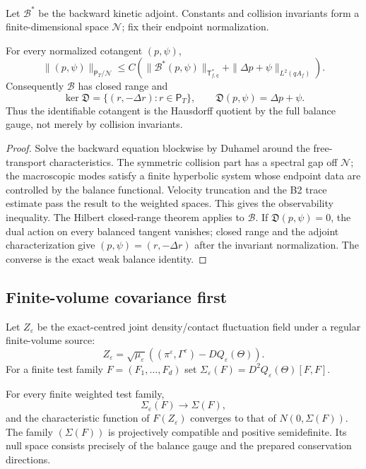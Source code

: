 Let $\mathcal B^*$ be the backward kinetic adjoint.  Constants and collision
invariants form a finite-dimensional space $\mathcal N$; fix their endpoint
normalization.

\begin{theorem}
\label{thm:r9-b3-range}
For every normalized cotangent $(p,\psi)$,
\[
 \|(p,\psi)\|_{\mathsf P_T/\mathcal N}
 \le C\left(
  \|\mathcal B^*(p,\psi)\|_{\mathsf T_{f,q}^*}
  +\|\Delta p+\psi\|_{L^2(qA_f)}
 \right).
\]
Consequently $\mathcal B$ has closed range and
\[
 \ker\mathfrak D
 =\{(r,-\Delta r):r\in\mathsf P_T\},
 \qquad
 \mathfrak D(p,\psi)=\Delta p+\psi.
\]
Thus the identifiable cotangent is the Hausdorff quotient by the full balance
gauge, not merely by collision invariants.
\end{theorem}

\begin{proof}
Solve the backward equation blockwise by Duhamel around the free-transport
characteristics.  The symmetric collision part has a spectral gap off
$\mathcal N$; the macroscopic modes satisfy a finite hyperbolic system whose
endpoint data are controlled by the balance functional.  Velocity truncation
and the B2 trace estimate pass the result to the weighted spaces.  This gives
the observability inequality.  The Hilbert closed-range theorem applies to
$\mathcal B$.  If $\mathfrak D(p,\psi)=0$, the dual action on every balanced
tangent vanishes; closed range and the adjoint characterization give
$(p,\psi)=(r,-\Delta r)$ after the invariant normalization.  The converse is
the exact weak balance identity.
\end{proof}

\subsection{Finite-volume covariance first}

Let $Z_\varepsilon$ be the exact-centred joint density/contact fluctuation
field under a regular finite-volume source:
\[
 Z_\varepsilon
 =\sqrt{\mu_\varepsilon}
 \left((\pi^\varepsilon,\Gamma^\varepsilon)
 -D Q_\varepsilon(\Theta)\right).
\]
For a finite test family $F=(F_1,\ldots,F_d)$ set
$\Sigma_\varepsilon(F)=D^2Q_\varepsilon(\Theta)[F,F]$.

\begin{theorem}
\label{thm:r9-b3-finiteclt}
For every finite weighted test family,
\[
 \Sigma_\varepsilon(F)\longrightarrow\Sigma(F),
\]
and the characteristic function of $F(Z_\varepsilon)$ converges to that of
$N(0,\Sigma(F))$.  The family $(\Sigma(F))$ is projectively compatible and
positive semidefinite.  Its null space consists precisely of the balance gauge
and the prepared conservation directions.
\end{theorem}

